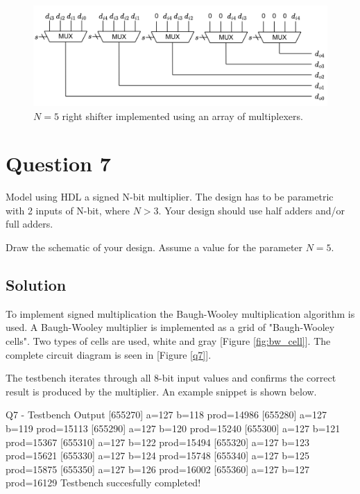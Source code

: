 \documentclass[../main.tex]{subfiles}
\begin{document}
\begin{figure}[h]
    \centering
    \includegraphics[width=1.0\linewidth]{assets/q6.png}
    \caption{$N = 5$ right shifter implemented using an array of multiplexers.}
    \label{q6}
\end{figure}

\newpage

\section{Question 7}

Model using HDL a signed N-bit multiplier. The design has to be parametric with 2 inputs of N-bit, where $N > 3$. Your design should use half adders and/or full adders.

Draw the schematic of your design. Assume a value for the parameter $N = 5$.

\subsection*{Solution}

To implement signed multiplication the Baugh-Wooley multiplication algorithm is used. A Baugh-Wooley multiplier is implemented as a grid of "Baugh-Wooley cells". Two types of cells are used, white and gray [Figure \ref{fig:bw_cell}]. The complete circuit diagram is seen in [Figure \ref{q7}].

The testbench iterates through all 8-bit input values and confirms the correct result is produced by the multiplier. An example snippet is shown below.

\begin{mintedterminal}{Q7 - Testbench Output}
[655270] a=127 b=118 prod=14986
[655280] a=127 b=119 prod=15113
[655290] a=127 b=120 prod=15240
[655300] a=127 b=121 prod=15367
[655310] a=127 b=122 prod=15494
[655320] a=127 b=123 prod=15621
[655330] a=127 b=124 prod=15748
[655340] a=127 b=125 prod=15875
[655350] a=127 b=126 prod=16002
[655360] a=127 b=127 prod=16129
Testbench succesfully completed!
\end{mintedterminal}
\end{document}
